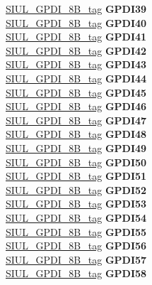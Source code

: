 \begin{DoxyCompactItemize}
\begin{tabbing}
\>\>\mbox{\hyperlink{unionSIUL__GPDI__8B__tag}{SIUL\_GPDI\_8B\_tag}} {\bfseries GPDI39}\\
\>\>\mbox{\hyperlink{unionSIUL__GPDI__8B__tag}{SIUL\_GPDI\_8B\_tag}} {\bfseries GPDI40}\\
\>\>\mbox{\hyperlink{unionSIUL__GPDI__8B__tag}{SIUL\_GPDI\_8B\_tag}} {\bfseries GPDI41}\\
\>\>\mbox{\hyperlink{unionSIUL__GPDI__8B__tag}{SIUL\_GPDI\_8B\_tag}} {\bfseries GPDI42}\\
\>\>\mbox{\hyperlink{unionSIUL__GPDI__8B__tag}{SIUL\_GPDI\_8B\_tag}} {\bfseries GPDI43}\\
\>\>\mbox{\hyperlink{unionSIUL__GPDI__8B__tag}{SIUL\_GPDI\_8B\_tag}} {\bfseries GPDI44}\\
\>\>\mbox{\hyperlink{unionSIUL__GPDI__8B__tag}{SIUL\_GPDI\_8B\_tag}} {\bfseries GPDI45}\\
\>\>\mbox{\hyperlink{unionSIUL__GPDI__8B__tag}{SIUL\_GPDI\_8B\_tag}} {\bfseries GPDI46}\\
\>\>\mbox{\hyperlink{unionSIUL__GPDI__8B__tag}{SIUL\_GPDI\_8B\_tag}} {\bfseries GPDI47}\\
\>\>\mbox{\hyperlink{unionSIUL__GPDI__8B__tag}{SIUL\_GPDI\_8B\_tag}} {\bfseries GPDI48}\\
\>\>\mbox{\hyperlink{unionSIUL__GPDI__8B__tag}{SIUL\_GPDI\_8B\_tag}} {\bfseries GPDI49}\\
\>\>\mbox{\hyperlink{unionSIUL__GPDI__8B__tag}{SIUL\_GPDI\_8B\_tag}} {\bfseries GPDI50}\\
\>\>\mbox{\hyperlink{unionSIUL__GPDI__8B__tag}{SIUL\_GPDI\_8B\_tag}} {\bfseries GPDI51}\\
\>\>\mbox{\hyperlink{unionSIUL__GPDI__8B__tag}{SIUL\_GPDI\_8B\_tag}} {\bfseries GPDI52}\\
\>\>\mbox{\hyperlink{unionSIUL__GPDI__8B__tag}{SIUL\_GPDI\_8B\_tag}} {\bfseries GPDI53}\\
\>\>\mbox{\hyperlink{unionSIUL__GPDI__8B__tag}{SIUL\_GPDI\_8B\_tag}} {\bfseries GPDI54}\\
\>\>\mbox{\hyperlink{unionSIUL__GPDI__8B__tag}{SIUL\_GPDI\_8B\_tag}} {\bfseries GPDI55}\\
\>\>\mbox{\hyperlink{unionSIUL__GPDI__8B__tag}{SIUL\_GPDI\_8B\_tag}} {\bfseries GPDI56}\\
\>\>\mbox{\hyperlink{unionSIUL__GPDI__8B__tag}{SIUL\_GPDI\_8B\_tag}} {\bfseries GPDI57}\\
\>\>\mbox{\hyperlink{unionSIUL__GPDI__8B__tag}{SIUL\_GPDI\_8B\_tag}} {\bfseries GPDI58}\\

\end{tabbing}
\end{DoxyCompactItemize}
